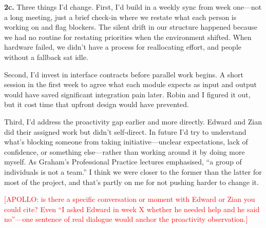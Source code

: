 \textbf{2c.}
Three things I'd change. First, I'd build in a weekly sync from week one---not a long meeting, just a brief check-in where we restate what each person is working on and flag blockers. The silent drift in our structure happened because we had no routine for restating priorities when the environment shifted. When hardware failed, we didn't have a process for reallocating effort, and people without a fallback sat idle.

Second, I'd invest in interface contracts before parallel work begins. A short session in the first week to agree what each module expects as input and output would have saved significant integration pain later. Robin and I figured it out, but it cost time that upfront design would have prevented.

Third, I'd address the proactivity gap earlier and more directly. Edward and Zian did their assigned work but didn't self-direct. In future I'd try to understand what's blocking someone from taking initiative---unclear expectations, lack of confidence, or something else---rather than working around it by doing more myself. As Graham's Professional Practice lectures emphasised, ``a group of individuals is not a team.'' I think we were closer to the former than the latter for most of the project, and that's partly on me for not pushing harder to change it.

\textcolor{red}{[APOLLO: is there a specific conversation or moment with Edward or Zian you could cite? Even ``I asked Edward in week X whether he needed help and he said no''---one sentence of real dialogue would anchor the proactivity observation.]}
